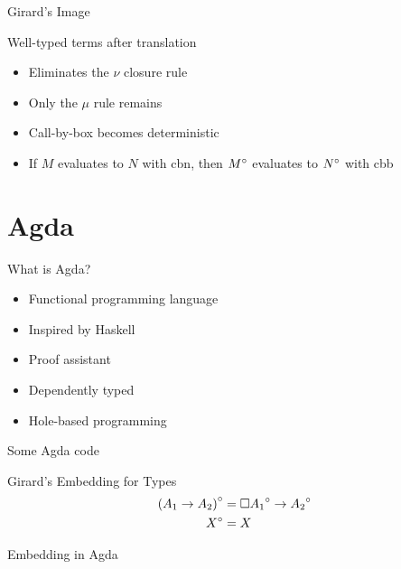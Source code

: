 \documentclass{beamer}
\theoremstyle{definition}
\begin{document}
  \begin{frame}{Girard's Image}
    \begin{block}{Well-typed terms after translation}
      \vspace{7pt}
      \begin{grammar}{
      }
      \end{grammar}
    \end{block} \pause
    \vspace{5pt}
    \begin{itemize}
      \item[\textbullet] Eliminates the \alert{$\nu$} closure rule \pause
      \item[\textbullet] Only the \alert{$\mu$} rule remains \pause
      \item[\textbullet] Call-by-box becomes \alert{deterministic} \pause
      \item[\textbullet] If $M$ evaluates to $N$ with \alert{\textsf{cbn}}, then ${M}^\circ$ evaluates to ${N}^\circ$ with \alert{\textsf{cbb}} 
    \end{itemize}
  \end{frame}

  \section{Agda}

  \begin{frame}{What is Agda?}
    \begin{itemize}
      \item[\textbullet] Functional programming language \pause
      \item[\textbullet] Inspired by Haskell  \pause
      \item[\textbullet] Proof assistant \pause
      \item[\textbullet] Dependently typed \pause
      \item[\textbullet] Hole-based programming
    \end{itemize}
  \end{frame}

  \begin{frame}{Some Agda code}
    \begin{block}{Girard's Embedding for Types}
      \begin{align*}
        {(A_1 \to A_2)}^\circ     & = \square{{A_1}^\circ} \to {A_2}^\circ      \\                                         
        {X}^\circ                 & = X                                         
      \end{align*}
    \end{block} \pause
    \begin{block}{Embedding in Agda}
      
    \end{block}
  \end{frame}
\end{document}
